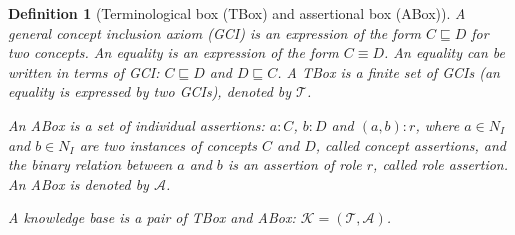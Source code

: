 \documentclass{article}
\newtheorem{mydef}{Definition}
\begin{document}
\begin{mydef}[Terminological box (TBox) and assertional box (ABox)]
A general concept inclusion axiom (GCI) is an expression of the form $C\sqsubseteq D$ for two  concepts. 
An equality is an expression of the form $C\equiv D$. An equality can be written in terms of GCI: $C\sqsubseteq D$ and $D\sqsubseteq C$.
A TBox is a finite set of GCIs (an equality is expressed by two GCIs), denoted by $\mathcal{T}$.

An ABox is a set of individual assertions: $a:C$, $b:D$ and $(a,b):r$, where $a\in N_I$ and $b\in N_I$ are two instances of concepts $C$ and $D$, called concept assertions, and
the binary relation between $a$ and $b$ is an assertion of role $r$, called role assertion. An ABox is denoted by $\mathcal{A}$.

A knowledge base is a pair of TBox and ABox: $\mathcal{K}=(\mathcal{T},\mathcal{A})$.
\end{mydef}
\end{document}
